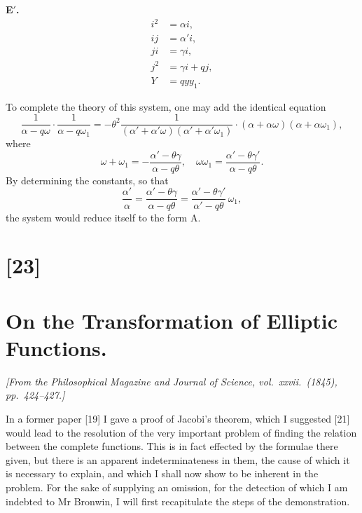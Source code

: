 \documentclass[12pt,a4paper]{article}
\begin{document}
\newpage
\setcounter{page}{131}

\medskip
\textbf{E$'$.}
\begin{align*}
i^2 &= \alpha i,\\
ij &= \alpha' i,\\
ji &= \gamma i,\\
j^2 &= \gamma i + q j,\\
Y &= q y y_1.
\end{align*}

To complete the theory of this system, one may add the identical equation
\[
\frac{1}{\alpha - q\omega}\cdot\frac{1}{\alpha - q\omega_1}
= -\theta^2 \frac{1}{(\alpha' + \alpha'\omega)(\alpha' + \alpha'\omega_1)} \cdot (\alpha + \alpha\omega)(\alpha + \alpha\omega_1),
\]
where
\[
\omega + \omega_1 = -\frac{\alpha' - \theta\gamma}{\alpha - q\theta},\quad
\omega\omega_1 = \frac{\alpha' - \theta\gamma'}{\alpha - q\theta}.
\]
By determining the constants, so that
\[
\frac{\alpha'}{\alpha} = \frac{\alpha' - \theta\gamma}{\alpha - q\theta} = \frac{\alpha' - \theta\gamma'}{\alpha' - q\theta}\,\omega_1,
\]
the system would reduce itself to the form A.

\newpage
\section*{[23]}
\section*{On the Transformation of Elliptic Functions.}

\textit{[From the Philosophical Magazine and Journal of Science, vol.~xxvii.~(1845), pp.~424--427.]}

\bigskip
\setcounter{page}{132}

In a former paper [19] I gave a proof of Jacobi's theorem, which I suggested [21] would lead to the resolution of the very important problem of finding the relation between the complete functions. This is in fact effected by the formulae there given, but there is an apparent indeterminateness in them, the cause of which it is necessary to explain, and which I shall now show to be inherent in the problem. For the sake of supplying an omission, for the detection of which I am indebted to Mr Bronwin, I will first recapitulate the steps of the demonstration.
\end{document}
